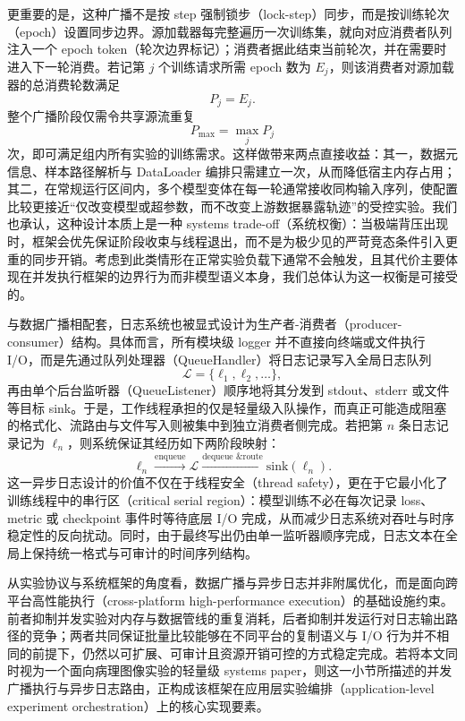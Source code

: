 更重要的是，这种广播不是按 step 强制锁步（lock-step）同步，而是按训练轮次（epoch）设置同步边界。源加载器每完整遍历一次训练集，就向对应消费者队列注入一个 epoch token（轮次边界标记）；消费者据此结束当前轮次，并在需要时进入下一轮消费。若记第 $j$ 个训练请求所需 epoch 数为 $E_j$，则该消费者对源加载器的总消费轮数满足
\begin{equation}
    P_j = E_j.
\end{equation}
整个广播阶段仅需令共享源流重复
\begin{equation}
    P_{\max} = \max_j P_j
\end{equation}
次，即可满足组内所有实验的训练需求。这样做带来两点直接收益：其一，数据元信息、样本路径解析与 DataLoader 编排只需建立一次，从而降低宿主内存占用；其二，在常规运行区间内，多个模型变体在每一轮通常接收同构输入序列，使配置比较更接近“仅改变模型或超参数，而不改变上游数据暴露轨迹”的受控实验。我们也承认，这种设计本质上是一种 systems trade-off（系统权衡）：当极端背压出现时，框架会优先保证阶段收束与线程退出，而不是为极少见的严苛竞态条件引入更重的同步开销。考虑到此类情形在正常实验负载下通常不会触发，且其代价主要体现在并发执行框架的边界行为而非模型语义本身，我们总体认为这一权衡是可接受的。

与数据广播相配套，日志系统也被显式设计为生产者-消费者（producer-consumer）结构。具体而言，所有模块级 logger 并不直接向终端或文件执行 I/O，而是先通过队列处理器（QueueHandler）将日志记录写入全局日志队列
\begin{equation}
    \mathcal{L} = \{\ell_1, \ell_2, \dots\},
\end{equation}
再由单个后台监听器（QueueListener）顺序地将其分发到 stdout、stderr 或文件等目标 sink。于是，工作线程承担的仅是轻量级入队操作，而真正可能造成阻塞的格式化、流路由与文件写入则被集中到独立消费者侧完成。若把第 $n$ 条日志记录记为 $\ell_n$，则系统保证其经历如下两阶段映射：
\begin{equation}
    \ell_n \xrightarrow{\text{enqueue}} \mathcal{L} \xrightarrow{\text{dequeue \& route}} \mathrm{sink}(\ell_n).
\end{equation}
这一异步日志设计的价值不仅在于线程安全（thread safety），更在于它最小化了训练线程中的串行区（critical serial region）：模型训练不必在每次记录 loss、metric 或 checkpoint 事件时等待底层 I/O 完成，从而减少日志系统对吞吐与时序稳定性的反向扰动。同时，由于最终写出仍由单一监听器顺序完成，日志文本在全局上保持统一格式与可审计的时间序列结构。

从实验协议与系统框架的角度看，数据广播与异步日志并非附属优化，而是面向跨平台高性能执行（cross-platform high-performance execution）的基础设施约束。前者抑制并发实验对内存与数据管线的重复消耗，后者抑制并发运行对日志输出路径的竞争；两者共同保证批量比较能够在不同平台的复制语义与 I/O 行为并不相同的前提下，仍然以可扩展、可审计且资源开销可控的方式稳定完成。若将本文同时视为一个面向病理图像实验的轻量级 systems paper，则这一小节所描述的并发广播执行与异步日志路由，正构成该框架在应用层实验编排（application-level experiment orchestration）上的核心实现要素。
